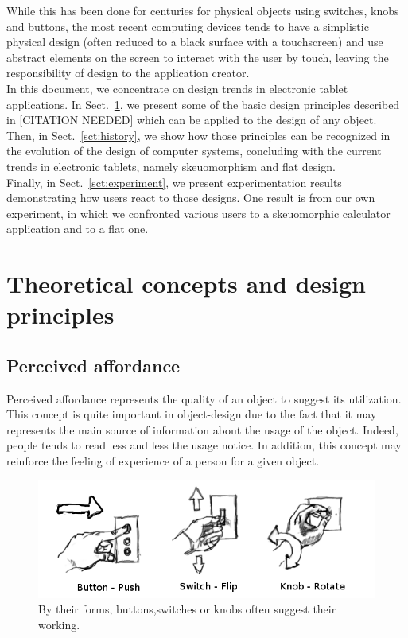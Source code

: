 \documentclass[a4paper,11pt] {article}
\theoremstyle{definition}
\begin{document}
While this has been done for centuries for physical objects using switches, knobs and buttons, the most recent computing devices tends to have a simplistic physical design (often reduced to a black surface with a touchscreen) and use abstract elements on the screen to interact with the user by touch, leaving the responsibility of design to the application creator.\\

In this document, we concentrate on design trends in electronic tablet applications. In Sect.~\ref{sct:theory}, we present some of the basic design principles described in [CITATION NEEDED] which can be applied to the design of any object.\\

Then, in Sect.~\ref{sct:history}, we show how those principles can be recognized in the evolution of the design of computer systems, concluding with the current trends in electronic tablets, namely skeuomorphism and flat design.\\

Finally, in Sect.~\ref{sct:experiment}, we present experimentation results demonstrating how users react to those designs. One result is from our own experiment, in which we confronted various users to a skeuomorphic calculator application and to a flat one.\\

\section{Theoretical concepts and design principles}
\label{sct:theory}

    \subsection{Perceived affordance}

Perceived affordance represents the quality of an object to suggest its utilization. This concept is quite important in object-design due to the fact that it may represents the main source of information about the usage of the object. Indeed, people tends to read less and less the usage notice. In addition, this concept may reinforce the feeling of experience of a person for a given object.

\begin{figure}[h]
\centering
\includegraphics[scale=0.40]{fig-report/switches-only.png}
\caption{By their forms, buttons,switches or knobs often suggest their working.}
\end{figure}
\end{document}

